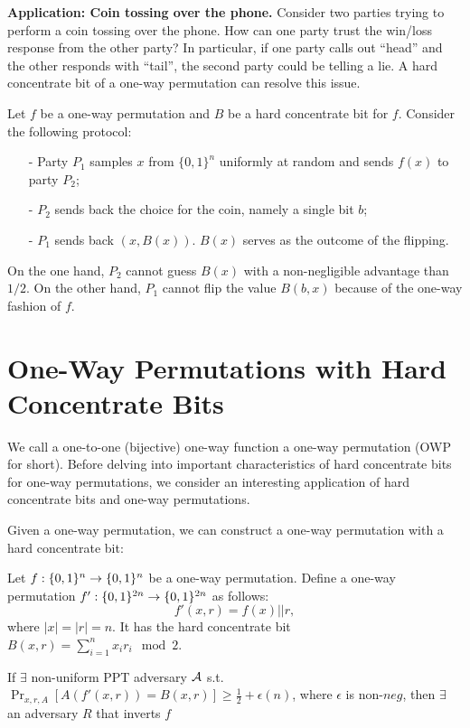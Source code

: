\bigskip
\noindent\textbf{Application: Coin tossing over the phone.}
Consider two parties trying to perform a coin tossing over the phone.  How can one party trust the win/loss response from the other party?  In particular, if one party calls out ``head'' and the other responds with ``tail'', the second party could be telling a lie.
A hard concentrate bit of a one-way permutation can resolve this issue.

Let $f$ be a one-way permutation and $B$ be a hard concentrate bit for $f$. Consider the following protocol:
\begin{itemize}
\item[-] Party $P_1$ samples $x$ from $\{0,1\}^n$ uniformly at random and sends $f(x)$ to party $P_2$;
\item[-] $P_2$ sends back the choice for the coin, namely a single bit $b$;
\item[-] $P_1$ sends back $(x, B(x))$.  $B(x)$ serves as the outcome of the flipping.
\end{itemize}
On the one hand, $P_2$ cannot guess $B(x)$ with a non-negligible advantage than $1/2$.
On the other hand, $P_1$ cannot flip the value $B(b,x)$  because of the one-way fashion of $f$. 

\section{One-Way Permutations with Hard Concentrate Bits}
We call a one-to-one (bijective) one-way function a one-way permutation (OWP for short).
Before delving into important characteristics of hard concentrate bits for one-way permutations, we consider an interesting application of hard concentrate bits and one-way permutations.





\bigskip
Given a one-way permutation, we can construct a one-way permutation with a hard concentrate bit:
\begin{theorem}
Let  $f:\{0,1\}^{n} \rightarrow \{0,1\}^{n}$ be a one-way permutation.
Define a one-way permutation $f':\{0,1\}^{2n} \rightarrow \{0,1\}^{2n}$ as follows:
$$f'(x,r) = f(x) || r,$$
where $|x| = |r| =n$. It has the hard concentrate bit $B(x, r) = \sum_{i=1}^n x_i r_i\mod 2$.
\end{theorem}
\proof
{}
If $\exists$ non-uniform PPT adversary $\mathcal{A}$ s.t. $\Pr_{x,r,A}[A(f'(x,r)) = B(x,r)] \ge \frac{1}{2} + \epsilon(n)$, where $\epsilon$ is non-$neg$, then $\exists$ an adversary $R$ that inverts $f$

